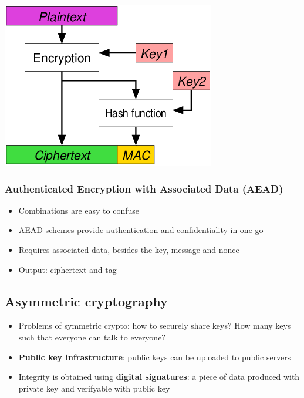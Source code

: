 \documentclass{article}
\newenvironment{Figure}
  {\par\medskip\noindent\minipage{\linewidth}}
  {\endminipage\par\medskip}
\newenvironment{myitemize}
{ \begin{itemize}
    \setlength{\itemsep}{005pt}
    \setlength{\parskip}{0pt}
    \setlength{\parsep}{0pt}     }
{ \end{itemize}                  }
\begin{document}
\begin{multicols}{2}
\begin{Figure}
 \centering
 \includegraphics[width=\linewidth]{img/w4_applied_crypto_encrypt_then_mac.png}
\end{Figure}

\subsubsection{Authenticated Encryption with Associated Data (AEAD)}

\begin{myitemize}
     \item Combinations are easy to confuse 
     \item AEAD schemes provide authentication and confidentiality in one go
     \item Requires associated data, besides the key, message and nonce
     \item Output: ciphertext and tag
\end{myitemize}


\subsection{Asymmetric cryptography}

\begin{myitemize}
     \item Problems of symmetric crypto: how to securely share keys? How many keys such that everyone can talk to everyone?
     \item \textbf{Public key infrastructure}: public keys can be uploaded to public servers
     \item Integrity is obtained using \textbf{digital signatures}: a piece of data produced with private key and verifyable with public key
\end{myitemize}



\end{multicols}
\end{document}
